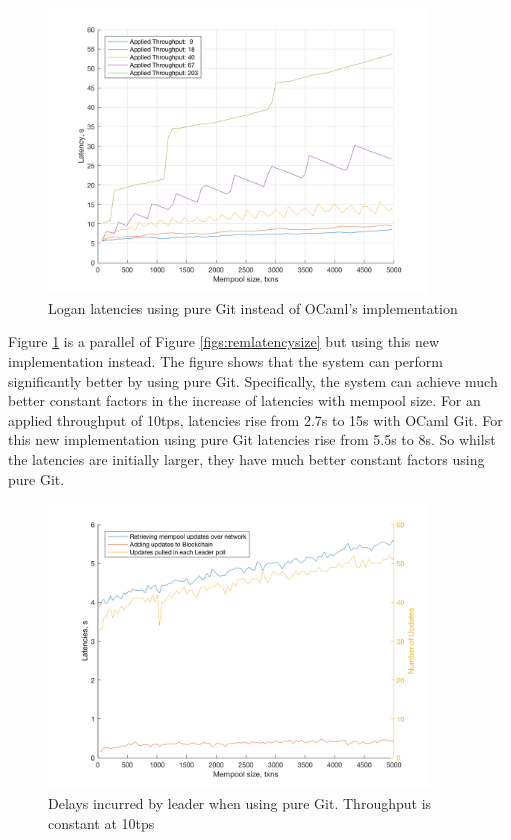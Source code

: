 \documentclass[12pt,a4paper,twoside,openright]{report}
\begin{document}
	\begin{figure}
		\centering
		\includegraphics[width=0.9\textwidth]{figs/latency_sizes_throughputs.png}
		\caption{Logan latencies using pure Git instead of OCaml's implementation}
		\label{figs:latenciespuregit}
	\end{figure}
	Figure \ref{figs:latenciespuregit} is a parallel of Figure \ref{figs:remlatencysize} but using this new implementation instead. 
	The figure shows that the system can perform significantly better by using pure Git. 
	Specifically, the system can achieve much better constant factors in the increase of latencies with mempool size.
	For an applied throughput of 10tps, latencies rise from 2.7s to 15s with OCaml Git. 
	For this new implementation using pure Git latencies rise from 5.5s to 8s. 
	So whilst the latencies are initially larger, they have much better constant factors using pure Git.
	\begin{figure}
		\centering
		\includegraphics[width=0.9\textwidth]{figs/bottlenecks.png}
		\caption{Delays incurred by leader when using pure Git. Throughput is constant at 10tps}
		\label{figs:bottleneckspuregit}
	\end{figure}
\end{document}
